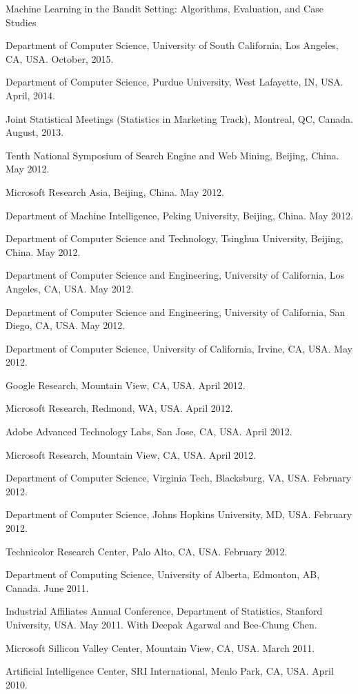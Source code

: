 \documentclass[10pt,twoside,letterpaper]{article}
\newcommand{\negitemspace}{\vspace{1mm}}
\begin{document}
\begin{compactitem}
\item{Machine Learning in the Bandit Setting: Algorithms, Evaluation, and Case Studies}
\begin{compactitem}
\item{Department of Computer Science, University of South California, Los Angeles, CA, USA. October, 2015.}
\item{Department of Computer Science, Purdue University, West Lafayette, IN, USA. April, 2014.}
\item{Joint Statistical Meetings (Statistics in Marketing Track), Montreal, QC, Canada.  August, 2013.}
\item{Tenth National Symposium of Search Engine and Web Mining, Beijing, China.  May 2012.}
\item{Microsoft Research Asia, Beijing, China.  May 2012.}
\item{Department of Machine Intelligence, Peking University, Beijing, China.  May 2012.}
\item{Department of Computer Science and Technology, Tsinghua University, Beijing, China.  May 2012.}
\item{Department of Computer Science and Engineering, University of California, Los Angeles, CA, USA.  May 2012.}
\item{Department of Computer Science and Engineering, University of California, San Diego, CA, USA.  May 2012.}
\item{Department of Computer Science, University of California, Irvine, CA, USA.  May 2012.}
\item{Google Research, Mountain View, CA, USA. April 2012.}
\item{Microsoft Research, Redmond, WA, USA. April 2012.}
\item{Adobe Advanced Technology Labs, San Jose, CA, USA.  April 2012.}
\item{Microsoft Research, Mountain View, CA, USA. April 2012.}
\item{Department of Computer Science, Virginia Tech, Blacksburg, VA, USA.  February 2012.}
\item{Department of Computer Science, Johns Hopkins University, MD, USA.  February 2012.}
\item{Technicolor Research Center, Palo Alto, CA, USA.  February 2012.}
\item{Department of Computing Science, University of Alberta, Edmonton, AB, Canada. June 2011.}
\item{Industrial Affiliates Annual Conference, Department of Statistics, Stanford University, USA.  May 2011.  With Deepak Agarwal and Bee-Chung Chen.}
\item{Microsoft Sillicon Valley Center, Mountain View, CA, USA.  March 2011.}
\item{Artificial Intelligence Center, SRI International, Menlo Park, CA, USA.  April 2010.}
\end{compactitem} \negitemspace


\end{compactitem}
\end{document}
